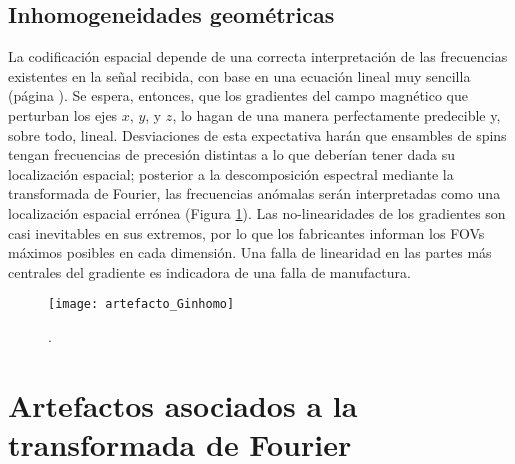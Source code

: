 \subsection{Inhomogeneidades geométricas}
La codificación espacial depende de una correcta interpretación de las frecuencias existentes en la señal recibida, con base en una ecuación lineal muy sencilla (página \pageref{eq_LarmorGradientes}). Se espera, entonces, que los gradientes del campo magnético que perturban los ejes $x$, $y$, y $z$, lo hagan de una manera perfectamente predecible y, sobre todo, lineal. Desviaciones de esta expectativa harán que ensambles de spins tengan frecuencias de precesión distintas a lo que deberían tener dada su localización espacial; posterior a la descomposición espectral mediante la transformada de Fourier, las frecuencias anómalas serán interpretadas como una localización espacial errónea (Figura \ref{fig:artefacto_Ginhomo}). Las no-linearidades de los gradientes son casi inevitables en sus extremos, por lo que los fabricantes informan los FOVs máximos posibles en cada dimensión. Una falla de linearidad en las partes más centrales del gradiente es indicadora de una falla de manufactura.

\begin{figure}[htb]
 \begin{figg}
   \texttt{[image: artefacto\_Ginhomo]}
   \caption{\figurapendiente. }
 \label{fig:artefacto_Ginhomo}
 \end{figg}
\end{figure}




\section{Artefactos asociados a la transformada de Fourier}
